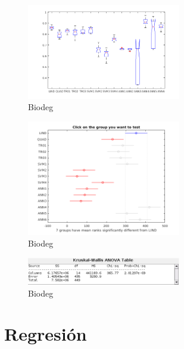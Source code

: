 \documentclass[a4paper,openwrite,12pt]{article}
\begin{document}
\begin{figure}[H]
\centering
\includegraphics[width=0.6\textwidth]{img/box_biodeg.bmp.png}
\caption{Biodeg}
\end{figure}

\begin{figure}[H]
\centering
\includegraphics[width=0.6\textwidth]{img/ranks_biodeg.bmp.png}
\caption{Biodeg}
\end{figure}


\begin{figure}[H]
\centering
\includegraphics[width=0.6\textwidth]{img/anova_biodeg.bmp.png}
\caption{Biodeg}
\end{figure}

\section{Regresión}
\end{document}
